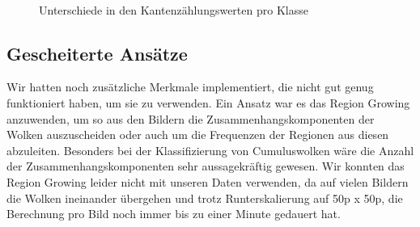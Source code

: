 \documentclass[a4,german]{article}
\begin{document}
\begin{figure}[h!]
\centering
{} \\
\caption{Unterschiede in den Kantenzählungswerten pro Klasse}
    \label{fig:kbs}
\end{figure}



\subsection{Gescheiterte Ansätze}
Wir hatten noch zusätzliche Merkmale implementiert, die nicht gut genug funktioniert haben, um sie zu verwenden.
Ein Ansatz war es das Region Growing anzuwenden, um so aus den Bildern die Zusammenhangskomponenten der Wolken auszuscheiden oder auch um die Frequenzen der Regionen aus diesen abzuleiten.
Besonders bei der Klassifizierung von Cumuluswolken
wäre die Anzahl der Zusammenhangskomponenten sehr aussagekräftig gewesen.
Wir konnten das Region Growing leider nicht mit unseren Daten verwenden, da auf vielen Bildern die Wolken ineinander übergehen und trotz Runterskalierung auf 50p x 50p, die Berechnung pro Bild noch immer bis zu einer Minute gedauert hat.
\end{document}
